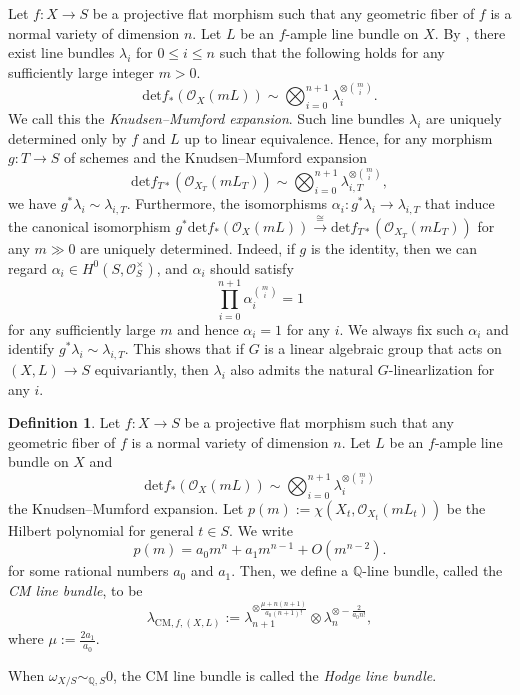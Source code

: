 \documentclass[12pt,twoside]{amsart}
\theoremstyle{definition}
\newtheorem{defn}[thm]{Definition}
\begin{document}
Let $f\colon X\to S$ be a projective flat morphism such that any geometric fiber of $f$ is a normal variety of dimension $n$.
Let $L$ be an $f$-ample line bundle on $X$.
By \cite[Theorem 4]{KnMu}, there exist line bundles $\lambda_{i}$ for $0\le i\le n$ such that the following holds for any sufficiently large integer $m>0$.
\[
\mathrm{det}f_*(\mathcal{O}_X(mL))\sim \bigotimes_{i=0}^{n+1}\lambda_i^{\otimes \binom{m}{i}}.
\]
We call this the {\it Knudsen--Mumford expansion}.
Such line bundles $\lambda_i$ are uniquely determined only by $f$ and $L$ up to linear equivalence.
Hence, for any morphism $g\colon T\to S$ of schemes and the Knudsen--Mumford expansion
\[
\mathrm{det}f_{T*}(\mathcal{O}_{X_T}(mL_T))\sim \bigotimes_{i=0}^{n+1}\lambda_{i,T}^{\otimes \binom{m}{i}}, 
\]
we have $g^*\lambda_i\sim \lambda_{i,T}$. 
Furthermore, the isomorphisms $\alpha_i\colon g^*\lambda_i\to \lambda_{i,T}$ that induce the canonical isomorphism $g^*\mathrm{det}f_*(\mathcal{O}_X(mL))\overset{\cong}{\longrightarrow}\mathrm{det}f_{T*}(\mathcal{O}_{X_T}(mL_T))$ for any $m \gg 0$ are uniquely determined.
Indeed, if $g$ is the identity, then we can regard $\alpha_i\in H^0(S,\mathcal{O}_S^\times)$, and $\alpha_i$ should satisfy
\[
\prod_{i=0}^{n+1}\alpha_i^{\binom{m}{i}}=1
\]
for any sufficiently large $m$ and hence $\alpha_i=1$ for any $i$.
We always fix such $\alpha_i$ and identify $g^*\lambda_i\sim \lambda_{i,T}$.
This shows that if $G$ is a linear algebraic group that acts on $(X,L)\to S$ equivariantly, then $\lambda_i$ also admits the natural $G$-linearlization for any $i$.

\begin{defn}\label{defn--CM--line--bundle}
    Let $f\colon X\to S$ be a projective flat morphism such that any geometric fiber of $f$ is a normal variety of dimension $n$.
Let $L$ be an $f$-ample line bundle on $X$ and 
\[
\mathrm{det}f_*(\mathcal{O}_X(mL))\sim \bigotimes_{i=0}^{n+1}\lambda_i^{\otimes \binom{m}{i}}
\] 
the Knudsen--Mumford expansion.
Let $p(m):=\chi(X_t,\mathcal{O}_{X_t}(mL_t))$ be the Hilbert polynomial for general $t\in S$. 
We write 
\[
p(m)=a_0m^n+a_1m^{n-1}+O(m^{n-2}).
\]
for some rational numbers $a_{0}$ and $a_{1}$. 
Then, we define a $\mathbb{Q}$-line bundle, called the {\em CM line bundle}, to be
$$\lambda_{\mathrm{CM},f,(X,L)}:=\lambda_{n+1}^{\otimes\frac{\mu+n(n+1)}{a_0(n+1)!}}\otimes\lambda_n^{\otimes -\frac{2}{a_0n!}},$$ where $\mu:=\frac{2a_1}{a_0}$.
\end{defn}

When $\omega_{X/S}\sim_{\mathbb{Q},S}0$, the CM line bundle is called the {\em Hodge line bundle}. 
\end{document}
